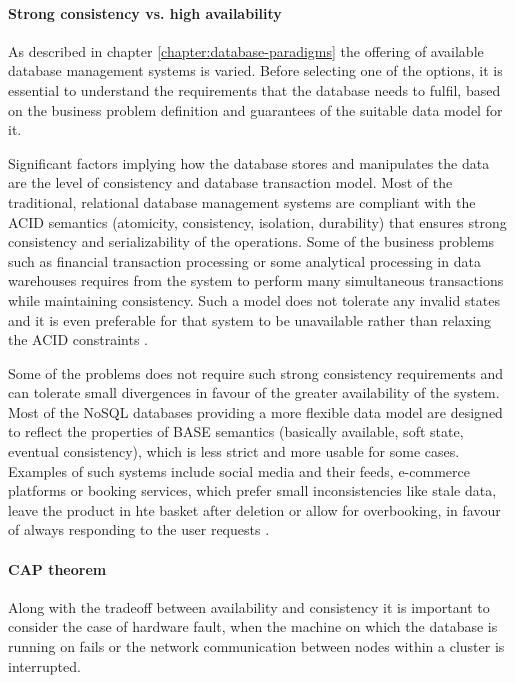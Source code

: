 \paragraph*{Strong consistency vs. high availability}

As described in chapter \ref{chapter:database-paradigms} the offering of available database management systems is varied. Before selecting one of the options, it is essential to understand the requirements that the database needs to fulfil, based on the business problem definition and guarantees of the suitable data model for it. 

Significant factors implying how the database stores and manipulates the data are the level of consistency and database transaction model. Most of the traditional, relational database management systems are compliant with the ACID semantics (atomicity, consistency, isolation, durability) that ensures strong consistency and serializability of the operations. Some of the business problems such as financial transaction processing or some analytical processing in data warehouses requires from the system to perform many simultaneous transactions while maintaining consistency. Such a model does not tolerate any invalid states and it is even preferable for that system to be unavailable rather than relaxing the ACID constraints \cite{PerspectivesOnArchitectureEvolution}.

Some of the problems does not require such strong consistency requirements and can tolerate small divergences in favour of the greater availability of the system. Most of the NoSQL databases providing a more flexible data model are designed to reflect the properties of BASE semantics (basically available, soft state, eventual consistency), which is less strict and more usable for some cases. Examples of such systems include social media and their feeds, e-commerce platforms or booking services, which prefer small inconsistencies like stale data, leave the product in hte basket after deletion or allow for overbooking, in favour of always responding to the user requests \cite{NoSQLDatabaseSystemsSurveyDecisionGuidance}.

\paragraph*{CAP theorem}

Along with the tradeoff between availability and consistency it is important to consider the case of hardware fault, when the machine on which the database is running on fails or the network communication between nodes within a cluster is interrupted. 

